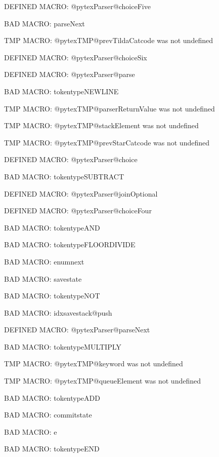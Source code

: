 \ifx\@pytexParser@choiceFive\undefined\else DEFINED MACRO: @pytexParser@choiceFive
\fi

BAD MACRO: parseNext

\ifx\@pytexTMP@prevTildaCatcode\undefined\else TMP MACRO: @pytexTMP@prevTildaCatcode was not undefined
\fi

\ifx\@pytexParser@choiceSix\undefined\else DEFINED MACRO: @pytexParser@choiceSix
\fi

\ifx\@pytexParser@parse\undefined\else DEFINED MACRO: @pytexParser@parse
\fi

BAD MACRO: tokentypeNEWLINE

\ifx\@pytexTMP@parserReturnValue\undefined\else TMP MACRO: @pytexTMP@parserReturnValue was not undefined
\fi

\ifx\@pytexTMP@stackElement\undefined\else TMP MACRO: @pytexTMP@stackElement was not undefined
\fi

\ifx\@pytexTMP@prevStarCatcode\undefined\else TMP MACRO: @pytexTMP@prevStarCatcode was not undefined
\fi

\ifx\@pytexParser@choice\undefined\else DEFINED MACRO: @pytexParser@choice
\fi

BAD MACRO: tokentypeSUBTRACT

\ifx\@pytexParser@joinOptional\undefined\else DEFINED MACRO: @pytexParser@joinOptional
\fi

\ifx\@pytexParser@choiceFour\undefined\else DEFINED MACRO: @pytexParser@choiceFour
\fi

BAD MACRO: tokentypeAND

BAD MACRO: tokentypeFLOORDIVIDE

BAD MACRO: enumnext

BAD MACRO: savestate

BAD MACRO: tokentypeNOT

BAD MACRO: idxsavestack@push

\ifx\@pytexParser@parseNext\undefined\else DEFINED MACRO: @pytexParser@parseNext
\fi

BAD MACRO: tokentypeMULTIPLY

\ifx\@pytexTMP@keyword\undefined\else TMP MACRO: @pytexTMP@keyword was not undefined
\fi

\ifx\@pytexTMP@queueElement\undefined\else TMP MACRO: @pytexTMP@queueElement was not undefined
\fi

BAD MACRO: tokentypeADD

BAD MACRO: commitstate

BAD MACRO: e

BAD MACRO: tokentypeEND

